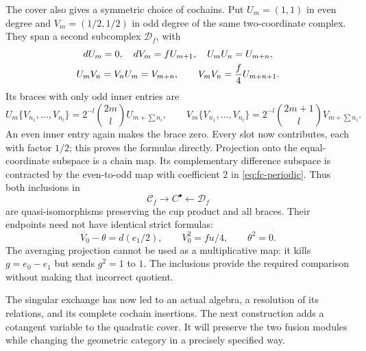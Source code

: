The cover also gives a symmetric choice of cochains. Put
\(U_m=(1,1)\) in even degree and \(V_m=(1/2,1/2)\) in odd degree
of the same two-coordinate complex. They span a second subcomplex
\(\mathcal D_f\), with
\begin{gather}\label{eq:fc-geometric-model}
 dU_m=0,\quad dV_m=fU_{m+1},\quad U_mU_n=U_{m+n},\\
 U_mV_n=V_nU_m=V_{m+n},\qquad
 V_mV_n=\frac f4U_{m+n+1}.\notag
\end{gather}
Its braces with only odd inner entries are
\[
 U_m\{V_{n_1},\ldots,V_{n_l}\}
 =2^{-l}\binom{2m}{l}U_{m+\sum n_i},\qquad
 V_m\{V_{n_1},\ldots,V_{n_l}\}
 =2^{-l}\binom{2m+1}{l}V_{m+\sum n_i}.
\]
An even inner entry again makes the brace zero. Every slot now
contributes, each with factor \(1/2\); this proves the formulas
directly. Projection onto the equal-coordinate subspace is a chain
map. Its complementary difference subspace is contracted by the
even-to-odd map with coefficient \(2\) in \eqref{eq:fc-periodic}.
Thus both inclusions in
\[
 \mathcal C_f\longrightarrow C^\bullet
 \longleftarrow\mathcal D_f
\]
are quasi-isomorphisms preserving the cup product and all braces.
Their endpoints need not have identical strict formulas:
\[
 V_0-\theta=d(e_1/2),\qquad V_0^2=fu/4,\qquad\theta^2=0.
\]
The averaging projection cannot be used as a multiplicative map:
it kills \(g=e_0-e_1\) but sends \(g^2=1\) to \(1\).
The inclusions provide the required comparison without making that
incorrect quotient.

The singular exchange has now led to an actual algebra, a resolution
of its relations, and its complete cochain insertions. The next
construction adds a cotangent variable to the quadratic cover. It
will preserve the two fusion modules while changing the geometric
category in a precisely specified way.
